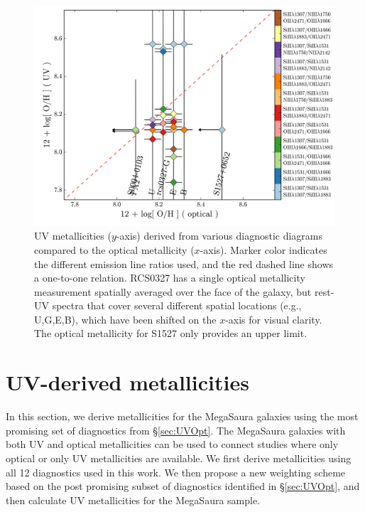 \documentclass[preprint2]{aastex62}
\newcommand{\mage}{{\sc Meg}a{\sc S}a{\sc ura}\xspace}
\begin{document}
\begin{figure}
  \begin{center}
    \includegraphics[width=\linewidth]{figs/f7.png}
    \caption{UV metallicities ($y$-axis) derived from various diagnostic diagrams compared to the optical metallicity ($x$-axis). Marker color indicates the different emission line ratios used, and the red dashed line shows a one-to-one relation. RCS0327 has a single optical metallicity measurement spatially averaged over the face of the galaxy, but rest-UV spectra that cover several different spatial locations (e.g., U,G,E,B), which have been shifted on the $x$-axis for visual clarity. The optical metallicity for S1527 only provides an upper limit.}
    \label{fig:UVZ}
  \end{center}
\end{figure}

\section{UV-derived metallicities}\label{sec:UVZ}

In this section, we derive metallicities for the \mage galaxies using the most promising set of diagnostics from \S\ref{sec:UVOpt}. The \mage galaxies with both UV and optical metallicities can be used to connect studies where only optical or only UV metallicities are available. We first derive metallicities using all 12 diagnostics used in this work. We then propose a new weighting scheme based on the post promising subset of diagnostics identified in \S\ref{sec:UVOpt}, and then calculate UV metallicities for the \mage sample.
\end{document}
